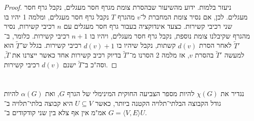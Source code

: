 \documentclass[]{article}
\newcommand\ra    {\rangle}
\newcommand\la    {\langle}
\newcommand\tl    {\tilde}
\begin{document}
\begin{proof}
		ניעזר בלמות. ידוע מהשיעור שבהסרת צומת מגרף חסר מעגלים, נקבל גרף חסר מעגלים. לכן, אם נסיר צומת המחברת ל־$v$ מהגרף $T$ נקבל גרף חסר מעגלים, ומלמה 1 יהיו בו שני רכיבי קשירות. כצעד אינדוקציה בעבור גרף חסר מעגלים עם $n$ רכיבי קשירות, נסיר מהגרף שקיבלנו צומת נוספת, נקבל גרף חסר מעגלים, ויהיו בו $n + 1$ רכיבי קשירות. כלומר, ב־$\tl T'$ לאחר הסרת $d(v)$ קשתות, נקבל שיהיו בו $d(v) + 1$ רכיבי קשירות. בגלל ש־$\tl T$ הוא למעשה $\tl T'$ בהסרת $v$, אז מלמה 2 הסרנו מ־$\tl T'$ בדיוק רכיב קשירות אחד כאשר ייצרנו את $\tl T$, וסה"כ ב־$\tl T$ ישנם $d(v)$ רכיבי קשירות. 
	\end{proof}
	\section{}
	\section{}
	נגדיר את $\chi(G)$ להיות מספר הצביעה החוקית המינימלי של הגרף $G$, ואת $\alpha(G)$ להיות גודל הקבוצה הבלתי־תלויה הקטנה ביותר, כאשר $U \subseteq V$ היא קבוצה בלתי־תלויה ב־$G = \la V, E \ra$ אמ"מ אין אף צלא בין שני קודקודים ב־$U$. 
\end{document}
